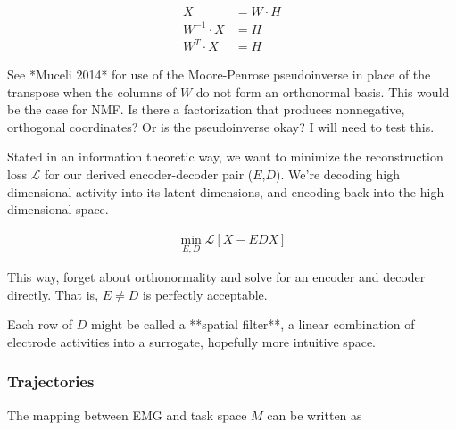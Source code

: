 \documentclass[../main.tex]{subfiles}
\begin{document}
\begin{align*}
X &= W\cdot{H} \\
W^{-1}\cdot{X} &= {H} \\
W^{T}\cdot{X} &= {H}
\end{align*}

See *Muceli 2014* for use of the Moore-Penrose pseudoinverse in place of the transpose when the columns of $W$ do not form an orthonormal basis. This would be the case for NMF. Is there a factorization that produces nonnegative, orthogonal coordinates? Or is the pseudoinverse okay? I will need to test this.

Stated in an information theoretic way, we want to minimize the reconstruction loss $\mathcal{L}$ for our derived encoder-decoder pair ($E$,$D$). We're decoding high dimensional activity into its latent dimensions, and encoding back into the high dimensional space.

\begin{align}
  \min_{E,D}{\mathcal{L}\left[X - EDX\right]}
\end{align}

This way, forget about orthonormality and solve for an encoder and decoder directly. That is, $E\neq{D}$ is perfectly acceptable.

Each row of $D$ might be called a **spatial filter**, a linear combination of electrode activities into a surrogate, hopefully more intuitive space.

\subsubsection{Trajectories}






The mapping between EMG and task space $M$ can be written as
\end{document}
